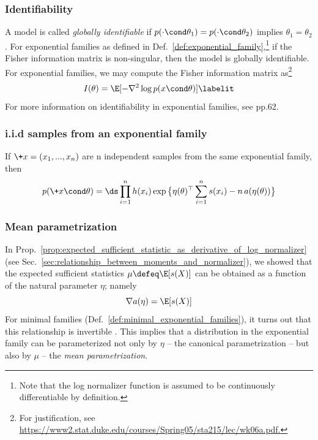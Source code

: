 \documentclass{article} %
\newcommand{\logNormalizerFunction}{a}
\newcommand{\sufficientStatsFunction}{s}
\newcommand{\carrierDensity}{h}
\newcommand{\meanParameter}{\mu}
\begin{document}
\subsubsection{Identifiability}

A model is called \textit{globally identifiable} if $p(\cdot \cond \theta_1) = p(\cdot \cond \theta_2)$ implies $\theta_1=\theta_2$ \cite{cole2020parameter}. For exponential families as defined in Def.~\ref{def:exponential_family},\footnote{Note that the log normalizer function is assumed to be continuously differentiable by definition.} if the Fisher information matrix is non-singular, then the model is globally identifiable.  For exponential families, we may compute the Fisher information matrix as\footnote{For justification, see \url{https://www2.stat.duke.edu/courses/Spring05/sta215/lec/wk06a.pdf.}}
\begin{align*}
I(\theta) = \E [ -\nabla^2 \log p(x \cond \theta)]
\labelit \label{eqn:fisher_information_matrix_for_exponential_families}	
\end{align*}
For more information on identifiability in exponential families, see \cite{cole2020parameter} pp.62. 

\subsubsection{i.i.d samples from an exponential family} \label{sec:iid_samples_from_an_exponential_family}
If $\+x=(x_1, ..., x_n)$ are n independent samples from the same exponential family, then 
\begin{align}
\label{eqn:exponential_family_iid}
 p(\+x \cond \theta) = \ds\prod_{i=1}^n \carrierDensity(x_i) \exp \big\{ \eta(\theta)^\top \sum_{i=1}^n \sufficientStatsFunction(x_i) - n \,\logNormalizerFunction(\eta(\theta))\big\} 
 \end{align}


\subsubsection{Mean parametrization} \label{sec:mean_parametrization}

In Prop.~\ref{prop:expected_sufficient_statistic_as_derivative_of_log_normalizer} (see Sec.~\ref{sec:relationship_between_moments_and_normalizer}), we showed that the expected sufficient statistics $\meanParameter \defeq \E[\sufficientStatsFunction(X)]$ can be obtained as a function of the natural parameter $\eta$; namely
%
\[ \nabla \logNormalizerFunction(\eta) = \E[\sufficientStatsFunction(X)] \]
%
For minimal families (Def.~\ref{def:minimal_exponential_families}), it turns out that this relationship is invertible \cite[Sec.~8.4]{jordan2010exponential}.   This implies that a distribution in the exponential family can be parameterized not only by $\eta$ -- the canonical parametrization -- but also by $\meanParameter$ -- the \textit{mean parametrization}.   
\end{document}

